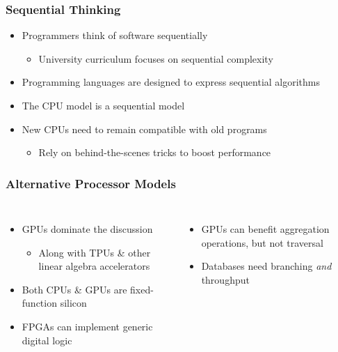 \documentclass{beamer}
\begin{document}
\begin{frame}
	\frametitle{Sequential Thinking}
	\begin{itemize}
		\item Programmers think of software sequentially
		\begin{itemize}
			\item University curriculum focuses on sequential complexity
		\end{itemize}
		\item Programming languages are designed to express sequential
		algorithms
		\item The CPU model is a sequential model
		\item New CPUs need to remain compatible with old programs
		\begin{itemize}
			\item Rely on behind-the-scenes tricks to boost performance
		\end{itemize}
	\end{itemize}
\end{frame}


\begin{frame}
	\frametitle{Alternative Processor Models}
	\begin{columns}
		\begin{itemize}
			\item GPUs dominate the discussion
			\begin{itemize}
				\item Along with TPUs \& other linear algebra accelerators
			\end{itemize}
			\item Both CPUs \& GPUs are fixed-function silicon
			\item FPGAs can implement generic digital logic
		\end{itemize}

		\begin{itemize}
			\item GPUs can benefit aggregation operations, but not traversal
			\item Databases need branching \emph{and} throughput
		\end{itemize}
	\end{columns}
\end{frame}
\end{document}
